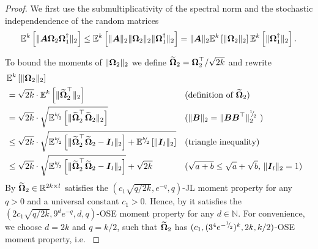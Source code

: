 \documentclass[12pt]{article}
\begin{document}
\begin{proof}
    We first use the submultiplicativity of the spectral norm and the stochastic independendence of the random matrices
    \begin{equation}
        \mathbb{E}^{k}\left[ \lVert \boldsymbol{A} \boldsymbol{\Omega}_2 \boldsymbol{\Omega}_1^{\dagger} \rVert _2 \right]
        \leq \mathbb{E}^{k}\left[ \lVert \boldsymbol{A} \rVert _2 \lVert \boldsymbol{\Omega}_2 \rVert _2 \lVert \boldsymbol{\Omega}_1^{\dagger} \rVert _2 \right]
        = \lVert \boldsymbol{A} \rVert _2 \mathbb{E}^{k}\left[ \lVert \boldsymbol{\Omega}_2 \rVert _2 \right] \mathbb{E}^{k}\left[  \lVert \boldsymbol{\Omega}_1^{\dagger} \rVert _2 \right].
        \label{equ:OSE-moment-bound-initial-new}
    \end{equation}

    To bound the moments of $\lVert \boldsymbol{\Omega}_2 \rVert _2$ we define $\widetilde{\boldsymbol{\Omega}}_2 = \boldsymbol{\Omega}_2^{\top} / \sqrt{2k}$ and rewrite
    \begin{align}
        &\mathbb{E}^{k}\left[ \lVert \mtx{\Omega}_2 \rVert _2 \right] \notag \\
        &= \sqrt{2k} \cdot \mathbb{E}^{k}\left[ \lVert \widetilde{\mtx{\Omega}}_2^{\top} \rVert _2 \right] && \text{(definition of $\widetilde{\mtx{\Omega}}_2$)} \notag \\
        &= \sqrt{2k} \cdot \sqrt{ \mathbb{E}^{\sfrac{k}{2}}\left[ \lVert \widetilde{\mtx{\Omega}}_2^{\top} \widetilde{\mtx{\Omega}}_2 \rVert _2 \right] } && \text{($\lVert \mtx{B} \rVert _2 = \lVert \mtx{B} \mtx{B}^{\top} \rVert _2^{\sfrac{1}{2}} $ )} \notag \\
        &\leq \sqrt{2k} \cdot \sqrt{ \mathbb{E}^{\sfrac{k}{2}}\left[ \lVert \widetilde{\mtx{\Omega}}_2^{\top} \widetilde{\mtx{\Omega}}_2 - \mtx{I}_l \rVert _2 \right] + \mathbb{E}^{\sfrac{k}{2}}\left[ \lVert \mtx{I}_l \rVert _2 \right]} && \text{(triangle inequality)} \notag \\
        &\leq \sqrt{2k} \cdot \sqrt{ \mathbb{E}^{\sfrac{k}{2}}\left[ \lVert \widetilde{\mtx{\Omega}}_2^{\top} \widetilde{\mtx{\Omega}}_2 - \mtx{I}_l \rVert _2 \right]} + \sqrt{2k} &&
         \text{($\sqrt{a+b} \leq \sqrt{a} + \sqrt{b}$, $\lVert \mtx{I}_l \rVert _2 = 1$)}
    \end{align}
    By \cite[section 2.2]{nelson-2017-sketching-algorithms} $\widetilde{\boldsymbol{\Omega}}_2 \in \mathbb{R}^{2k \times l}$ satisfies the $(c_1 \sqrt{q/2k}, e^{-q}, q)$-JL moment property for any $q > 0$ and a universal constant $c_1 > 0$. Hence, by \cite[lemma 4]{cohen-2016-optimal-approximate} it satisfies the $(2 c_1 \sqrt{q/2k}, 9^d e^{-q}, d, q)$-OSE moment property for any $d \in \mathbb{N}$. For convenience, we choose $d=2k$ and $q=k/2$, such that $\widetilde{\boldsymbol{\Omega}}_2$ has $(c_1, (3^4 e^{-{}^{1}{\mskip -5mu/\mskip -3mu}_{2}})^k, 2k, k/2)$-OSE moment property, i.e. \cite[definition 3]{cohen-2016-optimal-approximate}

\end{proof}
\end{document}

